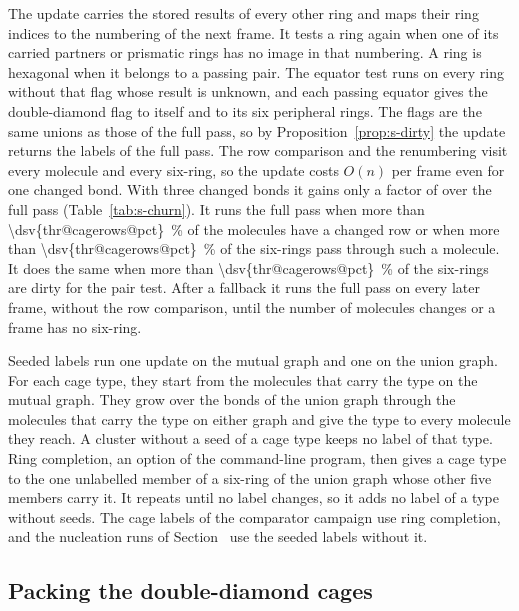 \documentclass[preprint,12pt]{elsarticle}
\begin{document}
The update carries the stored results of every other ring and maps their
ring indices to the numbering of the next frame.
It tests a ring again when one of its carried partners or prismatic
rings has no image in that numbering.
A ring is hexagonal when it belongs to a passing pair.
The equator test runs on every ring without that flag whose result is
unknown, and each passing equator gives the double-diamond flag to
itself and to its six peripheral rings.
The flags are the same unions as those of the full pass, so by
Proposition~\ref{prop:s-dirty} the update returns the labels of the full
pass.
The row comparison and the renumbering visit every molecule and every
six-ring, so the update costs $O(n)$ per frame even for one changed
bond.
With three changed bonds it gains only a factor of 
over the full pass (Table~\ref{tab:s-churn}).
It runs the full pass when more than
\qty{\dsv{thr@cagerows@pct}}{\percent} of the molecules have a changed
row or when more than \qty{\dsv{thr@cagerows@pct}}{\percent} of the
six-rings pass through such a molecule.
It does the same when more than \qty{\dsv{thr@cagerows@pct}}{\percent}
of the six-rings are dirty for the pair test.
After a fallback it runs the full pass on every later frame, without the
row comparison, until the number of molecules changes or a frame has no
six-ring.

Seeded labels run one update on the mutual graph and one on the union
graph.
For each cage type, they start from the molecules that carry the type on
the mutual graph.
They grow over the bonds of the union graph through the molecules that
carry the type on either graph and give the type to every molecule they
reach.
A cluster without a seed of a cage type keeps no label of that type.
Ring completion, an option of the command-line program, then gives a
cage type to the one unlabelled member of a six-ring of the union graph
whose other five members carry it.
It repeats until no label changes, so it adds no label of a type without
seeds.
The cage labels of the comparator campaign use ring completion, and the
nucleation runs of Section~ use the seeded labels
without it.

\subsection{Packing the double-diamond cages}
\label{sec:s-packing}
\end{document}
